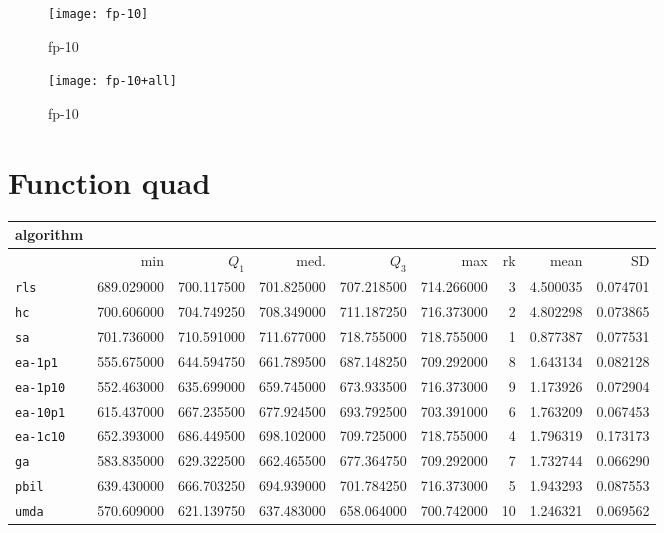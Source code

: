 \begin{center}
\begin{figure}[h]
\centering
\texttt{[image: fp-10]}
\caption{fp-10}
\end{figure}
\end{center}

\begin{center}
\begin{figure}[h]
\centering
\texttt{[image: fp-10+all]}
\caption{fp-10}
\end{figure}
\end{center}

\newpage

\section{Function quad}
\begin{center}
\begin{tabular}{@{}l*{5}{>{{}}N{3}{2}}>{{}}N{2}{0}N{1}{3}N{1}{3}@{}}
\toprule
{algorithm} &  &  \\
\midrule
& {min} & {$Q_1$} & {med.} & {$Q_3$} & {max} & {rk} & {mean} & {SD} \\
\midrule
\verb|rls| & 689.029000 & 700.117500 & 701.825000 & 707.218500 & 714.266000 & 3 & 4.500035 & 0.074701 \\
 \verb|hc| & 700.606000 & 704.749250 & 708.349000 & 711.187250 & 716.373000 & 2 & 4.802298 & 0.073865 \\
 \verb|sa| & {\color{blue}} 701.736000 & {\color{blue}} 710.591000 & {\color{blue}} 711.677000 & {\color{blue}} 718.755000 & {\color{blue}} 718.755000 & 1 & 0.877387 & 0.077531 \\
 \verb|ea-1p1| & 555.675000 & 644.594750 & 661.789500 & 687.148250 & 709.292000 & 8 & 1.643134 & 0.082128 \\
 \verb|ea-1p10| & 552.463000 & 635.699000 & 659.745000 & 673.933500 & 716.373000 & 9 & 1.173926 & 0.072904 \\
 \verb|ea-10p1| & 615.437000 & 667.235500 & 677.924500 & 693.792500 & 703.391000 & 6 & 1.763209 & 0.067453 \\
 \verb|ea-1c10| & 652.393000 & 686.449500 & 698.102000 & 709.725000 & {\color{blue}} 718.755000 & 4 & 1.796319 & 0.173173 \\
 \verb|ga| & 583.835000 & 629.322500 & 662.465500 & 677.364750 & 709.292000 & 7 & 1.732744 & 0.066290 \\
 \verb|pbil| & 639.430000 & 666.703250 & 694.939000 & 701.784250 & 716.373000 & 5 & 1.943293 & 0.087553 \\
 \verb|umda| & 570.609000 & 621.139750 & 637.483000 & 658.064000 & 700.742000 & 10 & 1.246321 & 0.069562 \\
 \bottomrule
\end{tabular}
\end{center}

